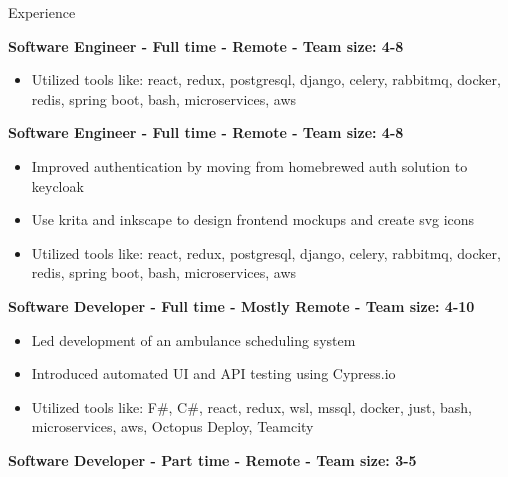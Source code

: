 \documentclass{resume} %
\begin{document}
\begin{rSection}{Experience}

\textbf{Software Engineer - Full time - Remote - Team size: 4-8} \\

\begin{itemize}
  \itemsep -2pt {}
      \item Utilized tools like: react, redux, postgresql, django, celery, rabbitmq, docker, redis, spring boot, bash, microservices, aws
\end{itemize}

\textbf{Software Engineer - Full time - Remote - Team size: 4-8} \\

\begin{itemize}
  \itemsep -2pt {}
      \item Improved authentication by moving from homebrewed auth solution to keycloak
    \item Use krita and inkscape to design frontend mockups and create svg icons
    \item Utilized tools like: react, redux, postgresql, django, celery, rabbitmq, docker, redis, spring boot, bash, microservices, aws
\end{itemize}

\textbf{Software Developer - Full time - Mostly Remote - Team size: 4-10} \\

\begin{itemize}
  \itemsep -2pt {}
      \item Led development of an ambulance scheduling system
    \item Introduced automated UI and API testing using Cypress.io
    \item Utilized tools like: F\#, C\#, react, redux, wsl, mssql, docker, just, bash, microservices, aws, Octopus Deploy, Teamcity
\end{itemize}

\textbf{Software Developer - Part time - Remote - Team size: 3-5} \\


\end{rSection}
\end{document}
